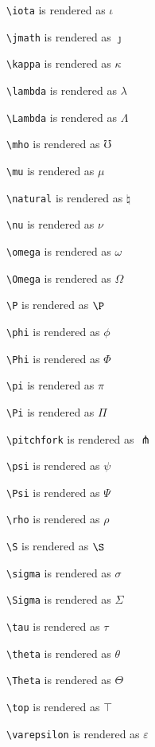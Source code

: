 \texttt{\textbackslash iota} is rendered as $\iota$


\texttt{\textbackslash jmath} is rendered as $\jmath$


\texttt{\textbackslash kappa} is rendered as $\kappa$


\texttt{\textbackslash lambda} is rendered as $\lambda$


\texttt{\textbackslash Lambda} is rendered as $\Lambda$


\texttt{\textbackslash mho} is rendered as $\mho$


\texttt{\textbackslash mu} is rendered as $\mu$


\texttt{\textbackslash natural} is rendered as $\natural$


\texttt{\textbackslash nu} is rendered as $\nu$


\texttt{\textbackslash omega} is rendered as $\omega$


\texttt{\textbackslash Omega} is rendered as $\Omega$


\texttt{\textbackslash P} is rendered as $\P$


\texttt{\textbackslash phi} is rendered as $\phi$


\texttt{\textbackslash Phi} is rendered as $\Phi$


\texttt{\textbackslash pi} is rendered as $\pi$


\texttt{\textbackslash Pi} is rendered as $\Pi$


\texttt{\textbackslash pitchfork} is rendered as $\pitchfork$


\texttt{\textbackslash psi} is rendered as $\psi$


\texttt{\textbackslash Psi} is rendered as $\Psi$


\texttt{\textbackslash rho} is rendered as $\rho$


\texttt{\textbackslash S} is rendered as $\S$


\texttt{\textbackslash sigma} is rendered as $\sigma$


\texttt{\textbackslash Sigma} is rendered as $\Sigma$


\texttt{\textbackslash tau} is rendered as $\tau$


\texttt{\textbackslash theta} is rendered as $\theta$


\texttt{\textbackslash Theta} is rendered as $\Theta$


\texttt{\textbackslash top} is rendered as $\top$


\texttt{\textbackslash varepsilon} is rendered as $\varepsilon$


